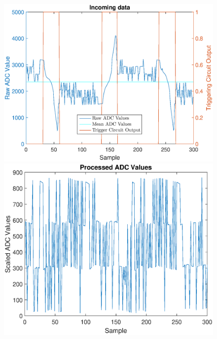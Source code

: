 \documentclass{beamer}
\begin{document}
\begin{frame}
		\begin{figure}[!tbp]
		  \centering
		  \begin{minipage}[b]{0.4\textwidth}
		    \includegraphics[width=\textwidth]{../chapters/evaluation-chapters/hardware/ac/raw-ac-testbed-adc-data.eps}
		  \end{minipage}
		  \hfill
		  \begin{minipage}[b]{0.4\textwidth}
		    \includegraphics[width=\textwidth]{../chapters/evaluation-chapters/hardware/ac/processed-ac-testbed-adc-data.eps}
		  \end{minipage}
		  \hfill
		  \begin{minipage}[b]{0.4\textwidth}

\end{minipage}
\end{figure}
\end{frame}
\end{document}
